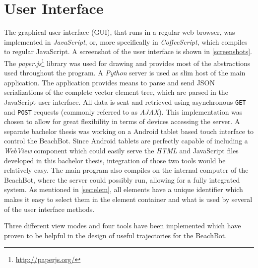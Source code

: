 \section{User Interface}

The graphical user interface (GUI), that runs in a regular web browser, was implemented in \textit{JavaScript}, or, more specifically in \textit{CoffeeScript}, which compiles to regular JavaScript. A screenshot of the user interface is shown in \autoref{screenshots}. The \textit{paper.js}\footnote{\url{http://paperjs.org/}} library was used for drawing and provides most of the abstractions used throughout the program. A \textit{Python} server is used as slim host of the main application. The application provides means to parse and send JSON serializations of the complete vector element tree, which are parsed in the JavaScript user interface. All data is sent and retrieved using asynchronous \texttt{GET} and \texttt{POST} requests (commonly referred to as \textit{AJAX}). This implementation was chosen to allow for great flexibility in terms of devices accessing the server. A separate bachelor thesis was working on a Android tablet based touch interface to control the BeachBot. Since Android tablets are perfectly capable of including a \textit{WebView} component which could easily serve the \textit{HTML} and JavaScript files developed in this bachelor thesis, integration of those two tools would be relatively easy. The main program also compiles on the internal computer of the BeachBot, where the server could possibly run, allowing for a fully integrated system. As mentioned in \autoref{sec:elem}, all elements have a unique identifier which makes it easy to select them in the element container and what is used by several of the user interface methods.

Three different view modes and four tools have been implemented which have proven to be helpful in the design of useful trajectories for the BeachBot.

